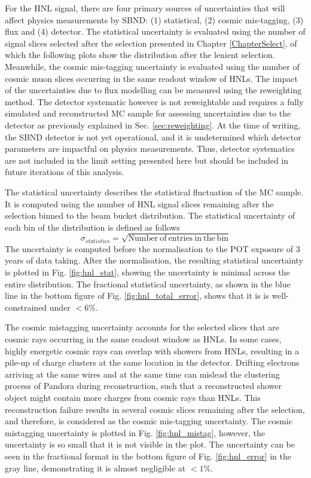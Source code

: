 For the HNL signal, there are four primary sources of uncertainties that will affect physics measurements by SBND: (1) statistical, (2) cosmic mis-tagging, (3) flux and (4) detector. 
The statistical uncertainty is evaluated using the number of signal slices selected after the selection presented
 in Chapter \ref{ChapterSelect}, of which the following plots show the distribution after the lenient selection.
Meanwhile, the cosmic mis-tagging uncertainty is evaluated using the number of cosmic muon slices occurring in the same readout window of HNLs.
The impact of the uncertainties due to flux modelling can be measured using the reweighting method.
The detector systematic however is not reweightable and requires a fully simulated and reconstructed MC sample for assessing uncertainties due to the detector as previously explained in Sec. \ref{sec:reweighting}.
At the time of writing, the SBND detector is not yet operational, and it is undetermined which detector parameters are impactful on physics measurements.
Thus, detector systematics are not included in the limit setting presented here but should be included in future
 iterations of this analysis.

The statistical uncertainty describes the statistical fluctuation of the MC sample.
It is computed using the number of HNL signal slices remaining after the selection binned to the beam bucket distribution.
The statistical uncertainty of each bin of the distribution is defined as follows 
\begin{equation}
\label{eq:stat_err}
\sigma_{statistics} = \sqrt{\mathrm{Number\ of\ entries\ in\ the\ bin}}
\end{equation}
The uncertainty is computed before the normalisation to the POT exposure of 3 years of data taking.
After the normalisation, the resulting statistical uncertainty is plotted in Fig. \ref{fig:hnl_stat}, showing the uncertainty is minimal across the entire distribution.
The fractional statistical uncertainty, as shown in the blue line in the bottom figure of Fig. \ref{fig:hnl_total_error}, shows that it is is well-constrained under $< 6\%$.

The cosmic mistagging uncertainty accounts for the selected slices that are cosmic rays occurring in the same readout window as HNLs.
In some cases, highly energetic cosmic rays can overlap with showers from HNLs, resulting in a pile-up of charge clusters at the same location in the detector.
Drifting electrons arriving at the same wires and at the same time can mislead the clustering process of Pandora 
during reconstruction, such that a reconstructed shower object might contain more charges from cosmic rays than HNLs.
This reconstruction failure results in several cosmic slices remaining after the selection, and therefore, is considered as the cosmic mis-tagging uncertainty.                                                                
The cosmic mistagging uncertainty is plotted in Fig. \ref{fig:hnl_mistag}, however, the uncertainty is so small that it is not visible in the plot.                                                                              
The uncertainty can be seen in the fractional format in the bottom figure of Fig. \ref{fig:hnl_error} in the gray line, demonstrating it is almost negligible at $< 1\%$. 

